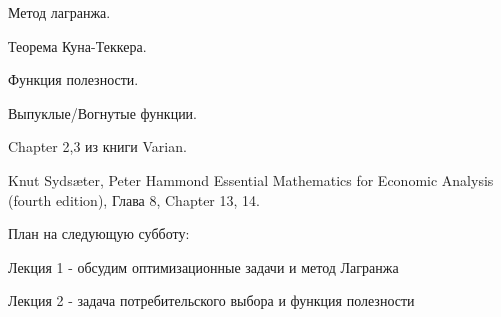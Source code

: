 \documentclass[reqno]{article}
\theoremstyle{definition}
\theoremstyle{definition}
\theoremstyle{definition}
\theoremstyle{definition}
\theoremstyle{definition}
\theoremstyle{definition}
\theoremstyle{definition}
\theoremstyle{definition}
\theoremstyle{definition}
\begin{document}
		Метод лагранжа.
		
		Теорема Куна-Теккера.
		
		Функция полезности.
		
		Выпуклые/Вогнутые функции.
		
		Chapter 2,3 из книги Varian.
		
		Knut Sydsæter, Peter Hammond Essential Mathematics for Economic Analysis (fourth edition), Глава 8, Chapter 13, 14.
		
		План на следующую субботу: 
		
		Лекция 1 - обсудим оптимизационные задачи и метод Лагранжа
		
		Лекция 2 - задача потребительского выбора и функция полезности
		
	\section{}
\end{document}
